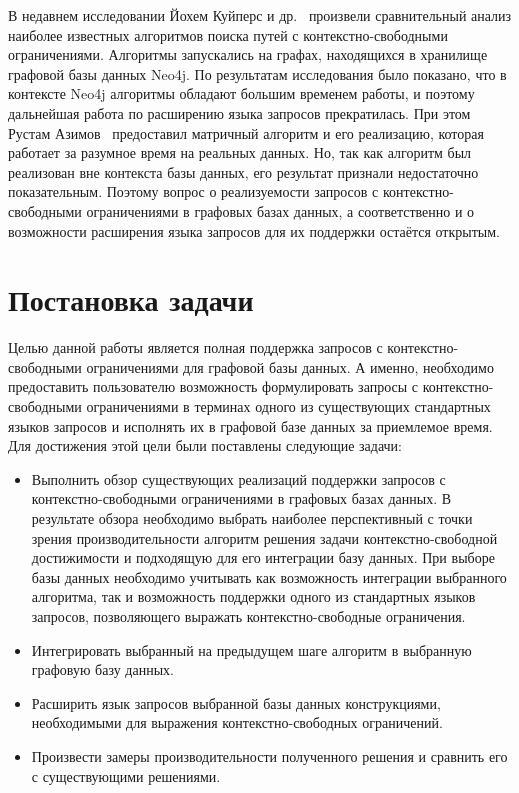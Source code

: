 В недавнем исследовании Йохем Куйперс и др.~\cite{Kuijpers:2019:ESC:3335783.3335791} произвели сравнительный анализ наиболее известных алгоритмов поиска путей с конте\-кстно-свободными ограничениями. Алгоритмы запускались на графах, находящихся в хранилище графовой базы данных Neo4j. По результатам исследования было показано, что в контексте Neo4j алгоритмы обладают большим временем работы, и поэтому дальнейшая работа по расширению языка запросов прекратилась. При этом Рустам Азимов~\cite{Azimov:2018:CPQ:3210259.3210264} предоставил матричный алгоритм и его реализацию, которая работает за разумное время на реальных данных. Но, так как алгоритм был реализован вне контекста базы данных, его результат признали недостаточно показательным. Поэтому вопрос о реализуемости запросов с контекстно-свободными ограничениями в графовых базах данных, а соответственно и о возможности расширения языка запросов для их поддержки остаётся открытым.

\section{Постановка задачи}
Целью данной работы является полная поддержка запросов с конте\-кстно-свободными ограничениями для графовой базы данных. А именно, необходимо предоставить пользователю возможность формулировать запросы с контекстно-свободными ограничениями в терминах одного из существующих стандартных языков запросов и исполнять их в графовой базе данных за приемлемое время. Для достижения этой цели были поставлены следующие задачи:

\begin{itemize}
    \item Выполнить обзор существующих реализаций поддержки запросов с контекстно-свободными ограничениями в графовых базах данных. В результате обзора необходимо выбрать наиболее перспективный с точки зрения производительности алгоритм решения задачи контекстно-свободной достижимости и подходящую для его интеграции базу данных. При выборе базы данных необходимо учитывать как возможность интеграции выбранного алгоритма, так и возможность поддержки одного из стандартных языков запросов, позволяющего выражать контекстно-свободные ограничения.
    \item Интегрировать выбранный на предыдущем шаге алгоритм в выбранную графовую базу данных.
    \item Расширить язык запросов выбранной базы данных конструкциями, необходимыми для выражения контекстно-свободных ограничений.
    \item Произвести замеры производительности полученного решения и сравнить его с существующими решениями.
\end{itemize}


